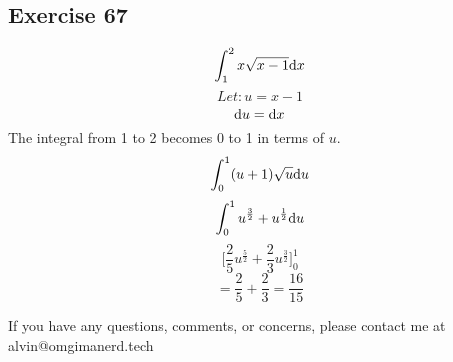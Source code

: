 \documentclass{math}
\begin{document}
\subsection*{Exercise 67}
\[ \int_{1}^{2} x \sqrt{x - 1} \mathrm{d}{x} \]
\[ Let: u = x - 1 \]
\[ \mathrm{d}{u} = \mathrm{d}{x} \]
The integral from 1 to 2 becomes 0 to 1 in terms of \( u \).
\[ \int_{0}^{1} (u + 1)\sqrt{u} \mathrm{d}{u} \]
\[ \int_{0}^{1} u^\frac{3}{2} + u^\frac{1}{2} \mathrm{d}{u} \]
\[ \bigg[ \frac{2}{5}u^{\frac{5}{2}} + \frac{2}{3}u^{\frac{3}{2}} \bigg]_0^1 \]
\[ = \frac{2}{5} + \frac{2}{3} = \frac{16}{15} \]

\begin{center}
  If you have any questions, comments, or concerns, please contact me at
  alvin@omgimanerd.tech
\end{center}
\end{document}
